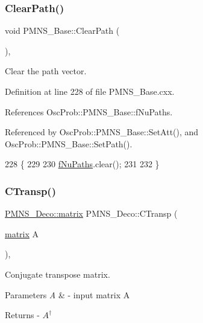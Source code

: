 \subsubsection{\texorpdfstring{Clear\+Path()}{ClearPath()}}
{\footnotesize\ttfamily void P\+M\+N\+S\+\_\+\+Base\+::\+Clear\+Path (\begin{DoxyParamCaption}{ }\end{DoxyParamCaption})\hspace{0.3cm}{\ttfamily [virtual]}, {\ttfamily [inherited]}}

Clear the path vector. 

Definition at line 228 of file P\+M\+N\+S\+\_\+\+Base.\+cxx.



References Osc\+Prob\+::\+P\+M\+N\+S\+\_\+\+Base\+::f\+Nu\+Paths.



Referenced by Osc\+Prob\+::\+P\+M\+N\+S\+\_\+\+Base\+::\+Set\+Att(), and Osc\+Prob\+::\+P\+M\+N\+S\+\_\+\+Base\+::\+Set\+Path().


\begin{DoxyCode}
228                          \{
229 
230   \hyperlink{classOscProb_1_1PMNS__Base_a69db9d57e12fc7cbe0431bc6c18fac93}{fNuPaths}.clear();
231 
232 \}
\end{DoxyCode}
\mbox{\label{classOscProb_1_1PMNS__Deco_aca391ff02be7abc2fd3dba40e9ce2665}} 
\subsubsection{\texorpdfstring{C\+Transp()}{CTransp()}}
{\footnotesize\ttfamily \hyperlink{classOscProb_1_1PMNS__Deco_a77b4e0c041b6268910a270be0f5387c9}{P\+M\+N\+S\+\_\+\+Deco\+::matrix} P\+M\+N\+S\+\_\+\+Deco\+::\+C\+Transp (\begin{DoxyParamCaption}\item[{\hyperlink{classOscProb_1_1PMNS__Deco_a77b4e0c041b6268910a270be0f5387c9}{matrix}}]{A }\end{DoxyParamCaption})\hspace{0.3cm}{\ttfamily [protected]}, {\ttfamily [virtual]}}

Conjugate transpose matrix.


\begin{DoxyParams}{Parameters}
{\em A} & -\/ input matrix A\\
\hline
\end{DoxyParams}
\begin{DoxyReturn}{Returns}
-\/ $A^{\dagger}$ 
\end{DoxyReturn}



